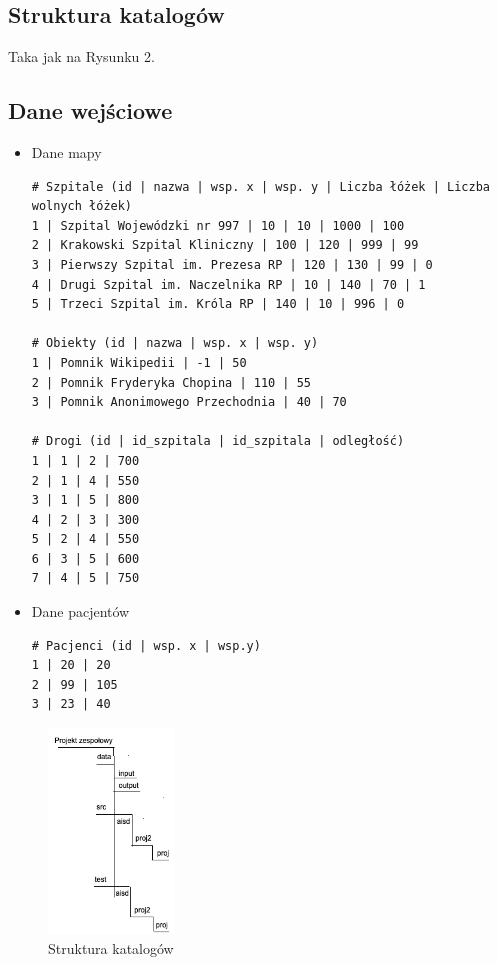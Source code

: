 \documentclass[11pt, a4paper]{article}
\begin{document}
    \subsection{Struktura katalogów}
    Taka jak na Rysunku 2.
    \subsection{Dane wejściowe}
    \begin{itemize}
        \item Dane mapy
        \begin{lstlisting}
# Szpitale (id | nazwa | wsp. x | wsp. y | Liczba łóżek | Liczba wolnych łóżek)
1 | Szpital Wojewódzki nr 997 | 10 | 10 | 1000 | 100
2 | Krakowski Szpital Kliniczny | 100 | 120 | 999 | 99
3 | Pierwszy Szpital im. Prezesa RP | 120 | 130 | 99 | 0
4 | Drugi Szpital im. Naczelnika RP | 10 | 140 | 70 | 1
5 | Trzeci Szpital im. Króla RP | 140 | 10 | 996 | 0

# Obiekty (id | nazwa | wsp. x | wsp. y)
1 | Pomnik Wikipedii | -1 | 50
2 | Pomnik Fryderyka Chopina | 110 | 55
3 | Pomnik Anonimowego Przechodnia | 40 | 70

# Drogi (id | id_szpitala | id_szpitala | odległość)
1 | 1 | 2 | 700
2 | 1 | 4 | 550
3 | 1 | 5 | 800
4 | 2 | 3 | 300
5 | 2 | 4 | 550
6 | 3 | 5 | 600
7 | 4 | 5 | 750
\end{lstlisting}
        \item Dane pacjentów
        \begin{lstlisting}
# Pacjenci (id | wsp. x | wsp.y)
1 | 20 | 20
2 | 99 | 105
3 | 23 | 40
        \end{lstlisting}
    \end{itemize}

\begin{figure}[ht]
    \centering
    \includegraphics[width=0.3\textwidth]{katalogi.png}
    \caption{Struktura katalogów}
    \label{fig:folder}
\end{figure}
\end{document}
